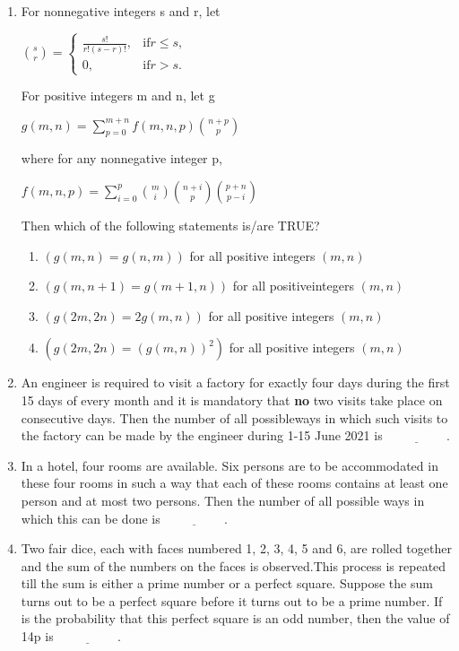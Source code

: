 \documentclass{article}
\begin{document}
\begin{enumerate}
\item For nonnegative integers s and r, let 
          
$\binom{s}{r} =
\begin{cases}
\frac{s!}{r!(s - r)!},&\text{if} r \leq s,\\ 0, & \text{if} r > s.
\end{cases}$

For positive integers m and n, let g
          
	  $g(m, n) = \sum_{p=0}^{m+n} f(m, n, p) \binom{n + p}{p}$
	  
where for any nonnegative integer p,

       $ f(m, n, p) = \sum_{i=0}^{p} \binom{m}{i} \binom{n + i}{p} \binom{p + n}{p - i}$

       
Then which of the following statements is/are TRUE?

\begin{enumerate}[label=\Alph*]
\item $( g(m, n) = g(n, m) )$ for all positive integers $( m, n )$
\item $( g(m, n + 1) = g(m + 1, n) )$ for all positiveintegers $( m, n )$  
\item $( g(2m, 2n) = 2 g(m, n) )$ for all positive integers $( m, n )$  
\item $( g(2m, 2n) = (g(m, n))^2 )$ for all positive integers $( m, n )$
\end{enumerate}

\item An engineer is required to visit a factory for exactly four days during the first 15 days of every month and it is mandatory that \textbf{no} two visits take place on consecutive days. Then the number of all possibleways in which such visits to the factory can be made by the engineer during 1-15 June 2021 is $\underline{\hspace{2cm}}.$

\item In a hotel, four rooms are available. Six persons are to be accommodated in these four rooms in such a way that each of these rooms contains at least one person and at most two persons. Then the number of all possible ways in which this can be done is $\underline{\hspace{2cm}}.$

\item Two fair dice, each with faces numbered 1, 2, 3, 4, 5 and 6, are rolled together and the sum of the numbers on the faces is observed.This process is repeated till the sum is either a prime number or a perfect square. Suppose the sum turns out to be a perfect square before it turns out to be a prime number. If  is the probability that this perfect square is an odd number, then the value of 14p is $\underline{\hspace{2cm}}.$


\end{enumerate}
\end{document}
